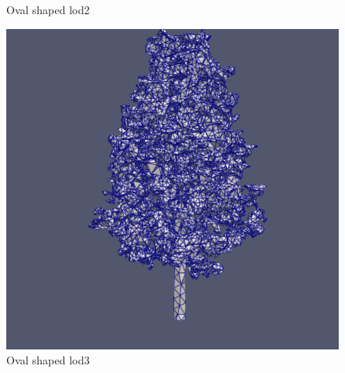 \documentclass[12pt]{article}
\begin{document}
\begin{figure}[H]
\begin{minipage}{0.30\textwidth}
        \caption{Oval shaped lod2}
    \end{minipage}
    \begin{minipage}{0.30\textwidth}
        \centering
        \includegraphics[width=1\textwidth]{images/tree-oval_lod3.png}
        \caption{Oval shaped lod3}
    \end{minipage}
\end{figure}
\end{document}
